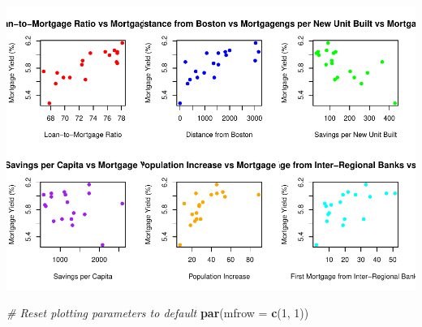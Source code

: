 \documentclass[
  12pt,
]{article}
\newenvironment{Shaded}{\begin{snugshade}}{\end{snugshade}}
\newcommand{\AttributeTok}[1]{\textcolor[rgb]{0.13,0.29,0.53}{#1}}
\newcommand{\CommentTok}[1]{\textcolor[rgb]{0.56,0.35,0.01}{\textit{#1}}}
\newcommand{\DecValTok}[1]{\textcolor[rgb]{0.00,0.00,0.81}{#1}}
\newcommand{\FunctionTok}[1]{\textcolor[rgb]{0.13,0.29,0.53}{\textbf{#1}}}
\newcommand{\NormalTok}[1]{#1}
\begin{document}
\includegraphics{report1_r1_files/figure-latex/unnamed-chunk-6-1.pdf}

\begin{Shaded}
\begin{Highlighting}[]
\CommentTok{\# Reset plotting parameters to default}
\FunctionTok{par}\NormalTok{(}\AttributeTok{mfrow =} \FunctionTok{c}\NormalTok{(}\DecValTok{1}\NormalTok{, }\DecValTok{1}\NormalTok{))}
\end{Highlighting}
\end{Shaded}
\end{document}
